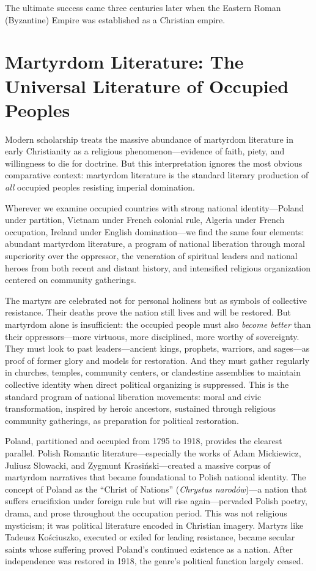 The ultimate success came three centuries later when the Eastern Roman (Byzantine) Empire was established as a Christian empire.

\section{Martyrdom Literature: The Universal Literature of Occupied Peoples}\label{sec:martyrdom-literature-occupied-peoples}

Modern scholarship treats the massive abundance of martyrdom literature in early Christianity as a religious phenomenon---evidence of faith, piety, and willingness to die for doctrine.
But this interpretation ignores the most obvious comparative context: martyrdom literature is the standard literary production of \emph{all} occupied peoples resisting imperial domination.

Wherever we examine occupied countries with strong national identity---Poland under partition, Vietnam under French colonial rule, Algeria under French occupation, Ireland under English domination---we find the same four elements: abundant martyrdom literature, a program of national liberation through moral superiority over the oppressor, the veneration of spiritual leaders and national heroes from both recent and distant history, and intensified religious organization centered on community gatherings.

The martyrs are celebrated not for personal holiness but as symbols of collective resistance.
Their deaths prove the nation still lives and will be restored.
But martyrdom alone is insufficient: the occupied people must also \emph{become better} than their oppressors---more virtuous, more disciplined, more worthy of sovereignty.
They must look to past leaders---ancient kings, prophets, warriors, and sages---as proof of former glory and models for restoration.
And they must gather regularly in churches, temples, community centers, or clandestine assemblies to maintain collective identity when direct political organizing is suppressed.
This is the standard program of national liberation movements: moral and civic transformation, inspired by heroic ancestors, sustained through religious community gatherings, as preparation for political restoration.

Poland, partitioned and occupied from 1795 to 1918, provides the clearest parallel.
Polish Romantic literature---especially the works of Adam Mickiewicz, Juliusz Słowacki, and Zygmunt Krasiński---created a massive corpus of martyrdom narratives that became foundational to Polish national identity.
The concept of Poland as the ``Christ of Nations'' (\emph{Chrystus narodów})---a nation that suffers crucifixion under foreign rule but will rise again---pervaded Polish poetry, drama, and prose throughout the occupation period.
This was not religious mysticism; it was political literature encoded in Christian imagery.
Martyrs like Tadeusz Kościuszko, executed or exiled for leading resistance, became secular saints whose suffering proved Poland's continued existence as a nation.
After independence was restored in 1918, the genre's political function largely ceased.

